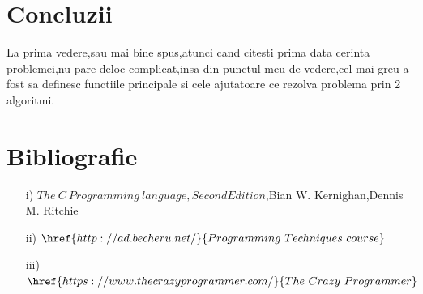 \documentclass[12pt]{article}
\begin{document}
\section{Concluzii}
La prima vedere,sau mai bine spus,atunci cand citesti prima data cerinta problemei,nu pare deloc complicat,insa din punctul meu de vedere,cel mai greu a fost sa definesc functiile principale si cele ajutatoare ce rezolva problema prin 2 algoritmi.


\section{Bibliografie}

\begin{itemize}
  \item [i)] $The\ C\ Programming\ language,Second Edition$,Bian W. Kernighan,Dennis M. Ritchie
  \item [ii)] $\href{http://ad.becheru.net/}{Programming\ Techniques\ course}$
  \item [iii)] $\href{https://www.thecrazyprogrammer.com/}{The\ Crazy \ Programmer}$

\end{itemize}

\pagebreak
\end{document}
